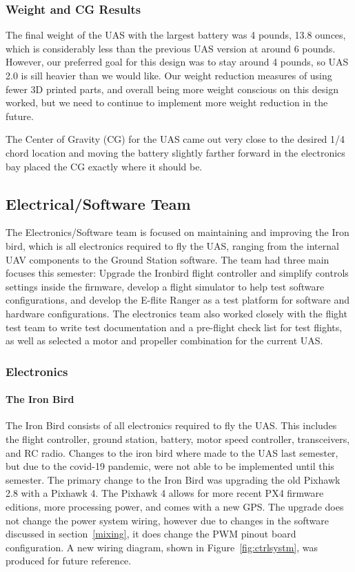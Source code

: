 \documentclass{article}
\begin{document}
\subsubsection{Weight and CG Results}
The final weight of the UAS with the largest battery was 4 pounds, 13.8 ounces, which is considerably less than the previous UAS version at around 6 pounds. However, our preferred goal for this design was to stay around 4 pounds, so UAS 2.0 is sill heavier than we would like. Our weight reduction measures of using fewer 3D printed parts, and overall being more weight conscious on this design worked, but we need to continue to implement more weight reduction in the future.

The Center of Gravity (CG) for the UAS came out very close to the desired 1/4 chord location and moving the battery slightly farther forward in the electronics bay placed the CG exactly where it should be.


\subsection{Electrical/Software Team}
The Electronics/Software team is focused on maintaining and improving the Iron bird, which is all electronics required to fly the UAS, ranging from the internal UAV components to the Ground Station software. The team had three main focuses this semester: Upgrade the Ironbird flight controller and simplify controls settings inside the firmware, develop a flight simulator to help test software configurations, and develop the E-flite Ranger as a test platform for software and hardware configurations. The electronics team also worked closely with the flight test team to write test documentation and a pre-flight check list for test flights, as well as selected a motor and propeller combination for the current UAS.
\subsubsection{Electronics}
\paragraph{The Iron Bird}
The Iron Bird consists of all electronics required to fly the UAS. This includes the flight controller, ground station, battery, motor speed controller, transceivers, and RC radio. Changes to the iron bird where made to the UAS last semester, but due to the covid-19 pandemic, were not able to be implemented until this semester. The primary change to the Iron Bird was upgrading the old Pixhawk 2.8 with a Pixhawk 4. The Pixhawk 4 allows for more recent PX4 firmware editions, more processing power, and comes with a new GPS. The upgrade does not change the power system wiring, however due to changes in the software discussed in section~\ref{mixing}, it does change the PWM pinout board configuration. A new wiring diagram, shown in Figure~\ref{fig:ctrlsystm},
was produced for future reference.
\end{document}
